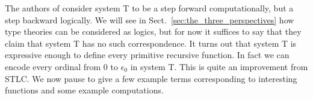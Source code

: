 The authors of \cite{Girard:1989} consider system T to be a step
forward computationally, but a step backward logically.  We will see
in Sect.~\ref{sec:the_three_perspectives} how type theories can be
considered as logics, but for now it suffices to say that they claim
that system T has no such correspondence.  It turns out that system T
is expressive enough to define every primitive recursive function.  In
fact we can encode every ordinal from 0 to $\epsilon_0$ in system T.
This is quite an improvement from STLC.  We now pause to give a few
example terms corresponding to interesting functions and some example
computations.


